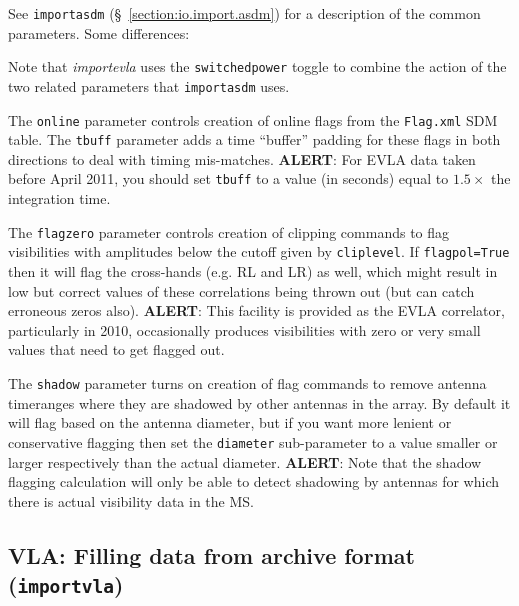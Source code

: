 See {\tt importasdm} (\S~\ref{section:io.import.asdm}) for a
description of the common parameters.  Some differences:

Note that {\it importevla} uses the {\tt switchedpower} toggle to combine the
action of the two related parameters that {\tt importasdm} uses.

The {\tt online} parameter controls creation of online flags from the 
{\tt Flag.xml} SDM table. The {\tt tbuff} parameter adds a time ``buffer''
padding for these flags in both directions to deal with timing mis-matches.
{\bf ALERT}: For EVLA data taken before April 2011, you should set {\tt tbuff}
to a value (in seconds) equal to $1.5\times$ the integration time.

The {\tt flagzero} parameter controls creation of clipping commands to flag
visibilities with amplitudes below the cutoff given by {\tt cliplevel}. If
{\tt flagpol=True} then it will flag the cross-hands (e.g. RL and LR) as well,
which might result in low but correct values of these correlations being thrown
out (but can catch erroneous zeros also).  
{\bf ALERT}: This facility is provided as the EVLA correlator, particularly in
2010, occasionally produces visibilities with zero or very small values that
need to get flagged out.

The {\tt shadow} parameter turns on creation of flag commands to remove antenna
timeranges where they are shadowed by other antennas in the array.  By default
it will flag based on the antenna diameter, but if you want more lenient or 
conservative flagging then set the {\tt diameter} sub-parameter to a value 
smaller or larger respectively than the actual diameter.
{\bf ALERT}: Note that the shadow flagging calculation will only be able to
detect shadowing by antennas for which there is actual visibility data in
the MS.

\subsection{VLA: Filling data from archive format ({\tt importvla})}
\label{section:io.import.vla}

